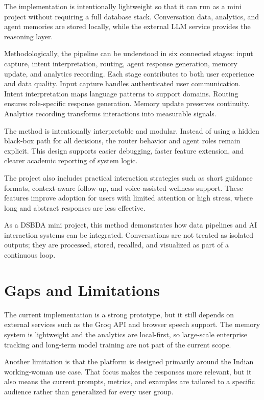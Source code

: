 \documentclass[oneside,a4paper,12pt]{report}
\begin{document}
The implementation is intentionally lightweight so that it can run as a mini project without requiring a full database stack. Conversation data, analytics, and agent memories are stored locally, while the external LLM service provides the reasoning layer.

Methodologically, the pipeline can be understood in six connected stages: input capture, intent interpretation, routing, agent response generation, memory update, and analytics recording. Each stage contributes to both user experience and data quality. Input capture handles authenticated user communication. Intent interpretation maps language patterns to support domains. Routing ensures role-specific response generation. Memory update preserves continuity. Analytics recording transforms interactions into measurable signals.

The method is intentionally interpretable and modular. Instead of using a hidden black-box path for all decisions, the router behavior and agent roles remain explicit. This design supports easier debugging, faster feature extension, and clearer academic reporting of system logic.

The project also includes practical interaction strategies such as short guidance formats, context-aware follow-up, and voice-assisted wellness support. These features improve adoption for users with limited attention or high stress, where long and abstract responses are less effective.

As a DSBDA mini project, this method demonstrates how data pipelines and AI interaction systems can be integrated. Conversations are not treated as isolated outputs; they are processed, stored, recalled, and visualized as part of a continuous loop.

\section{Gaps and Limitations}
The current implementation is a strong prototype, but it still depends on external services such as the Groq API and browser speech support. The memory system is lightweight and the analytics are local-first, so large-scale enterprise tracking and long-term model training are not part of the current scope.

Another limitation is that the platform is designed primarily around the Indian working-woman use case. That focus makes the responses more relevant, but it also means the current prompts, metrics, and examples are tailored to a specific audience rather than generalized for every user group.
\end{document}
